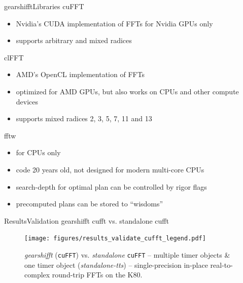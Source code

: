 \documentclass[t,10pt,hyperref={
  pdftitle = {gearshifft},
  pdfsubject = {gearshifft},
  pdfborder={0 0 0},
  colorlinks=true,
  urlcolor=red,
  citecolor=red,
  linkcolor=red,
  pdfauthor={Peter Steinbach, Matthias Werner}
  }
]{beamer}
\newcommand{\cufft}{\texttt{cuFFT}}
\begin{document}
\begin{frame}{gearshifft}{Libraries}
  cuFFT 
  \begin{itemize}
  \item Nvidia's CUDA implementation of FFTs for Nvidia GPUs only
  \item supports arbitrary and mixed radices
  \end{itemize}

  clFFT
  \begin{itemize}
  \item AMD's OpenCL implementation of FFTs
  \item optimized for AMD GPUs, but also works on CPUs and other compute devices
  \item supports mixed radices 2, 3, 5, 7, 11 and 13
  \end{itemize}

  fftw
  \begin{itemize}
  \item for CPUs only
  \item code 20 years old, not designed for modern multi-core CPUs
  \item search-depth for optimal plan can be controlled by rigor flags
  \item precomputed plans can be stored to ``wisdoms''
  \end{itemize}
  
\end{frame}




\begin{frame}{Results}{Validation gearshifft cufft vs. standalone cufft}
\begin{figure}[!htb]
  \centering
  \texttt{[image: figures/results\_validate\_cufft\_legend.pdf]}\\[-.5em]
  \hfill
  \caption{\textit{gearshifft} (\cufft{}) vs. \textit{standalone} \cufft{} --  multiple timer objects \& one timer object (\textit{standalone-tts}) -- single-precision in-place real-to-complex round-trip FFTs on the K80.}
  \label{fig:verify_cufft}
\end{figure}
\end{frame}
\end{document}
